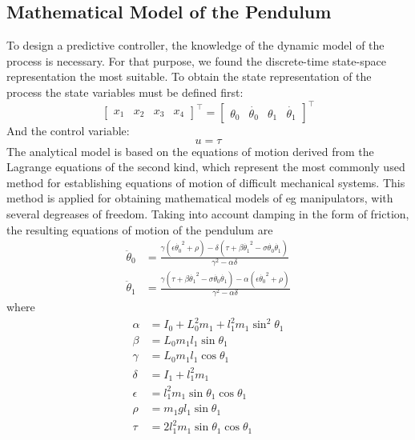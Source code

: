 \subsection{Mathematical Model of the Pendulum}
To design a predictive controller, the knowledge of the dynamic model of the process is necessary. For that purpose, we found the discrete-time state-space representation the most suitable.
To obtain the state representation of the process the state variables must be defined first:
\begin{equation}
	\begin{bmatrix}
	x_1 & x_2 & x_3 & x_4
	\end{bmatrix}^\intercal = 
	\begin{bmatrix}
	\theta_0 & \dot{\theta_0} & \theta_1 & \dot{\theta_1}
	\end{bmatrix}^\intercal
\end{equation}
And the control variable:
\begin{equation} u = \tau \end{equation}
The analytical model is based on the equations of motion derived from the Lagrange equations of the second kind, which represent the most commonly used method for establishing equations of motion of difficult mechanical systems. This method is applied for obtaining mathematical models of eg manipulators, with several degreases of freedom. Taking into account damping in the
form of friction, the resulting equations of motion of the
pendulum are 
\begin{subequations}
	\begin{align}
	\ddot{\theta}_0 &= \frac{\gamma(\epsilon\dot{\theta_0}^2+\rho)-\delta(\tau+\beta\dot{\theta_1}^2-\sigma\dot{\theta_0}\dot{\theta_1})}{\gamma^2-\alpha\delta}\\
	\ddot{\theta}_1 &= \frac{\gamma(\tau+\beta\dot{\theta_1}^2-\sigma\dot{\theta_0}\dot{\theta_1})-\alpha(\epsilon\dot{\theta_0}^2+\rho)}{\gamma^2-\alpha\delta}
	\end{align}
\end{subequations}
where
\begin{subequations}
	\begin{align}
	\alpha &= I_0+L_0^2m_1+l_1^2m_1\sin^2\theta_1\\
	\beta &= L_0m_1l_1\sin\theta_1 \\
	\gamma &= L_0m_1l_1\cos\theta_1\\
	\delta &= I_1+l_1^2m_1\\
	\epsilon &= l^2_1m_1\sin\theta_1\cos\theta_1\\
	\rho &= m_1gl_1\sin\theta_1\\
	\tau &= 2l^2_1m_1\sin\theta_1\cos\theta_1
	\end{align}
\end{subequations}
